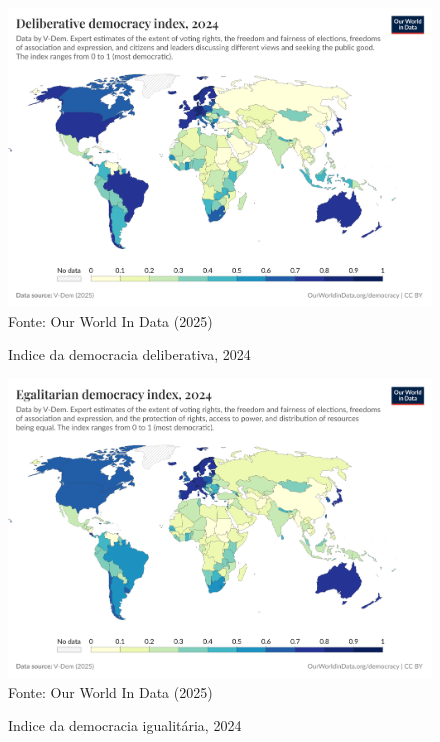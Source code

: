 \begin{figure}[ht]
    \centering
    \caption{Indice da democracia deliberativa, 2024}
    \includegraphics[width=1\linewidth]{figuras/democracia/deliberative-democracy-index-vdem.png}
    \label{fig:deliberative-democracy-index-vdem}
    \footnotesize{Fonte: Our World In Data (2025)}
\end{figure}

\begin{figure}[ht]
    \centering
    \caption{Indice da democracia igualitária, 2024}
    \includegraphics[width=1\linewidth]{figuras/democracia/egalitarian-democracy-index-vdem.png}
    \label{fig:egalitarian-democracy-index-vdem}
    \footnotesize{Fonte: Our World In Data (2025)}
\end{figure}

